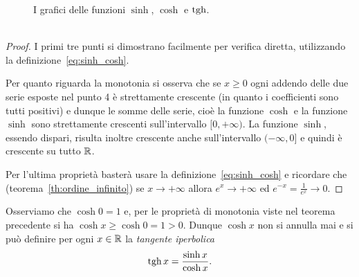 \newsavebox{\qrfigiperb}%
\begin{figure}
  \centering%
  \caption{%
    I grafici delle funzioni $\sinh$, $\cosh$ e $\tgh$.
    \ifwidemargin\\\\\fi%
    \usebox{\qrfigiperb}%
  }
\end{figure}

\begin{proof}
I primi tre punti si dimostrano facilmente per verifica diretta,
utilizzando la definizione~\eqref{eq:sinh_cosh}.


Per quanto riguarda la monotonia si osserva che se $x\ge 0$ ogni
addendo delle due serie esposte nel punto 4 è strettamente crescente
(in quanto i coefficienti sono tutti positivi) e dunque le somme delle serie,
cioè la funzione $\cosh$ e la funzione $\sinh$ sono strettamente crescenti
sull'intervallo $[0,+\infty)$. La funzione $\sinh$, essendo dispari,
risulta inoltre crescente anche sull'intervallo $(-\infty,0]$ e quindi
è crescente su tutto ${\mathbb R}$.

Per l'ultima proprietà basterà usare la definizione~\eqref{eq:sinh_cosh}
e ricordare che (teorema~\ref{th:ordine_infinito})
se $x\to +\infty$ allora
$e^x\to +\infty$ ed $e^{-x}=\frac{1}{e^{x}} \to 0$.
\end{proof}

Osserviamo che $\cosh 0 = 1$ e, per le proprietà di monotonia viste nel teorema
precedente si ha $\cosh x \ge \cosh 0 = 1 > 0$. Dunque $\cosh x$ non si annulla
mai e si può definire per ogni $x\in {\mathbb R}$ la \emph{tangente iperbolica}
%
\mymargin{$\tgh$}%
\index{$\tgh$}%
\[
    \operatorname{tgh} x = \frac{\sinh x}{\cosh x}.
\]

